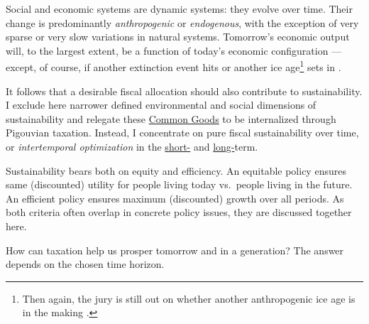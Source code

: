 

Social and economic systems are dynamic systems:
they evolve over time.
Their change is predominantly \emph{anthropogenic} or \emph{endogenous}, with the exception of very sparse or very slow variations in natural systems.
Tomorrow's economic output will, to the largest extent, be a function of today's economic
configuration --- except, of course, if another extinction event hits or another ice age\footnote{
	Then again, the jury is still out on whether another anthropogenic ice age is in the making \citep{UnitedNations2007, Rahmsdorf-2009}.}
sets in \citep{Courtillot2002}.

It follows that a desirable fiscal allocation should also contribute to sustainability.
I exclude here narrower defined environmental and social dimensions of sustainability and relegate these \hyperref[CommonGIcood]{Common Goods} to be internalized through Pigouvian taxation.
Instead, I concentrate on pure fiscal sustainability over time, or \emph{intertemporal optimization} in the \hyperref[ShortTermSmoothing]{short-} and \hyperref[LongTermSmoothing]{long-}term.

Sustainability bears both on equity and efficiency.
An equitable policy ensures same (discounted) utility for people living today vs.\ people living in the future.
An efficient policy ensures maximum (discounted) growth over all periods.
As both criteria often overlap in concrete policy issues, they are discussed together here.

How can taxation help us prosper tomorrow and in a generation?
The answer depends on the chosen time horizon.


